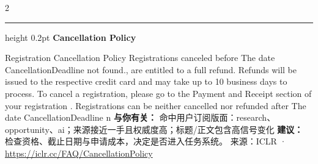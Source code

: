 \documentclass[10.5pt]{ctexart}
\begin{document}
\begin{multicols}{2}
\vspace{2mm}
\hrule height 0.2pt
\vspace{2mm}
{\large\bfseries Cancellation Policy}\par
Registration Cancellation Policy Registrations canceled before The date CancellationDeadline not found., are entitled to a full refund. Refunds will be issued to the respective credit card and may take up to 10 business days to process. To cancel a registration, please go to the Payment and Receipt section of your registration . Registrations can be neither cancelled nor refunded after The date CancellationDeadline n
\textbf{与你有关：} 命中用户订阅版面：research、opportunity、ai；来源接近一手且权威度高；标题/正文包含高信号变化
\textbf{建议：} 检查资格、截止日期与申请成本，决定是否进入任务系统。
{\footnotesize\color{ormuted} 来源：ICLR · \url{https://iclr.cc/FAQ/CancellationPolicy}}
\end{multicols}
\end{document}
